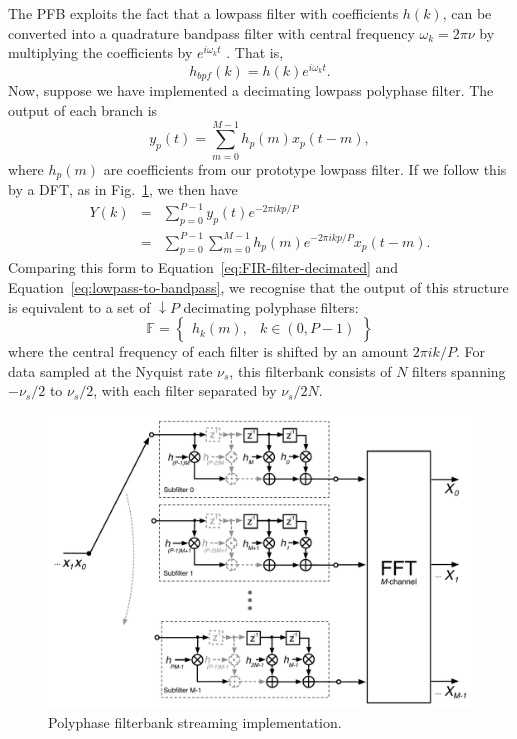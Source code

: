 \documentclass{ws-rv961x669}
\begin{document}
The PFB exploits the fact that a lowpass filter with coefficients $h(k)$, can be converted into a quadrature bandpass filter with central frequency $\omega_{k}=2\pi\nu$ by multiplying the coefficients by $e^{i\omega_{k}t}$ . That is, 
\begin{equation}
h_{bpf}(k)=h(k)e^{i\omega_{k}t}.\label{eq:lowpass-to-bandpass}
\end{equation}
Now, suppose we have implemented a decimating lowpass polyphase filter. The output of each branch is 
\begin{equation}
y_{p}(t)=\sum_{m=0}^{M-1}h_{p}(m)x_{p}(t-m),
\end{equation}
where $h_{p}(m)$ are coefficients from our prototype lowpass filter. If we follow this by a DFT, as in Fig.~\ref{fig:pfb_fir_fft}, we then have 
\begin{eqnarray}
Y(k) & = & \sum_{p=0}^{P-1}y_{p}(t)e^{-2\pi ikp/P}\\
 & = & \sum_{p=0}^{P-1}\sum_{m=0}^{M-1}h_{p}(m)e^{-2\pi ikp/P}x_{p}(t-m).
\end{eqnarray}
Comparing this form to Equation~\ref{eq:FIR-filter-decimated} and Equation~\ref{eq:lowpass-to-bandpass}, we recognise that the output
of this structure is equivalent to a set of $\downarrow P$ decimating polyphase filters:
\begin{equation}
\mathbb{F}=\begin{Bmatrix}h_{k}(m), & k\in(0,P-1)\end{Bmatrix}
\end{equation}
where the central frequency of each filter is shifted by an amount $\mbox{2}\pi ik/P$. For data sampled at the Nyquist rate $\nu_{s}$,
this filterbank consists of $N$ filters spanning $-\nu_{s}/\mbox{2}$ to $\nu_{s}/\mbox{2}$, with each filter separated by $\nu_{s}/\mbox{2}N$.

\begin{figure}
 \centering
 \includegraphics[width=\textwidth]{./figures/pfb_fir_fft}
 \caption{Polyphase filterbank streaming implementation.\label{fig:pfb_fir_fft}}
\end{figure}
\end{document}
